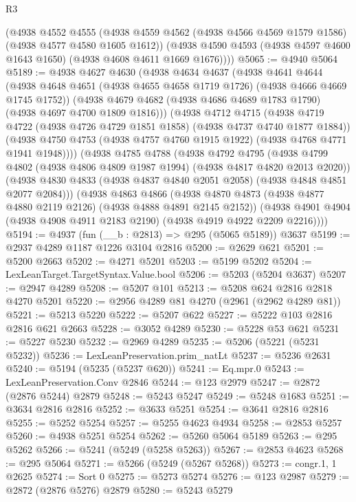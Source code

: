 \begin{lexlean}{R3}
\begin{coremodule}
      (@4938
        @4552
        @4555
        (@4938 @4559 @4562 (@4938 @4566 @4569 @1579 @1586) (@4938 @4577 @4580 @1605 @1612))
        (@4938 @4590 @4593 (@4938 @4597 @4600 @1643 @1650) (@4938 @4608 @4611 @1669 @1676))))
@5065 := @4940 @5064
@5189 := @4938
    @4627
    @4630
    (@4938
      @4634
      @4637
      (@4938
        @4641
        @4644
        (@4938 @4648 @4651 (@4938 @4655 @4658 @1719 @1726) (@4938 @4666 @4669 @1745 @1752))
        (@4938 @4679 @4682 (@4938 @4686 @4689 @1783 @1790) (@4938 @4697 @4700 @1809 @1816)))
      (@4938
        @4712
        @4715
        (@4938 @4719 @4722 (@4938 @4726 @4729 @1851 @1858) (@4938 @4737 @4740 @1877 @1884))
        (@4938 @4750 @4753 (@4938 @4757 @4760 @1915 @1922) (@4938 @4768 @4771 @1941 @1948))))
    (@4938
      @4785
      @4788
      (@4938
        @4792
        @4795
        (@4938 @4799 @4802 (@4938 @4806 @4809 @1987 @1994) (@4938 @4817 @4820 @2013 @2020))
        (@4938 @4830 @4833 (@4938 @4837 @4840 @2051 @2058) (@4938 @4848 @4851 @2077 @2084)))
      (@4938
        @4863
        @4866
        (@4938 @4870 @4873 (@4938 @4877 @4880 @2119 @2126) (@4938 @4888 @4891 @2145 @2152))
        (@4938 @4901 @4904 (@4938 @4908 @4911 @2183 @2190) (@4938 @4919 @4922 @2209 @2216))))
@5194 := @4937 (fun (__b : @2813) => @295 (@5065 @5189)) @3637
@5199 := @2937 @4289 @1187 @1226 @3104 @2816
@5200 := @2629 @621
@5201 := @5200 @2663
@5202 := @4271 @5201
@5203 := @5199 @5202
@5204 := LexLeanTarget.TargetSyntax.Value.bool
@5206 := @5203 (@5204 @3637)
@5207 := @2947 @4289
@5208 := @5207 @101
@5213 := @5208 @624 @2816 @2818 @4270 @5201
@5220 := @2956 @4289 @81 @4270 (@2961 (@2962 @4289 @81))
@5221 := @5213 @5220
@5222 := @5207 @622
@5227 := @5222 @103 @2816 @2816 @621 @2663
@5228 := @3052 @4289
@5230 := @5228 @53 @621
@5231 := @5227 @5230
@5232 := @2969 @4289
@5235 := @5206 (@5221 (@5231 @5232))
@5236 := LexLeanPreservation.prim_natLt
@5237 := @5236 @2631
@5240 := @5194 (@5235 (@5237 @620))
@5241 := Eq.mpr.{0}
@5243 := LexLeanPreservation.Conv @2846
@5244 := @123 @2979
@5247 := @2872 (@2876 @5244) @2879
@5248 := @5243 @5247
@5249 := @5248 @1683
@5251 := @3634 @2816 @2816
@5252 := @3633 @5251
@5254 := @3641 @2816 @2816
@5255 := @5252 @5254
@5257 := @5255 @4623 @4934
@5258 := @2853 @5257
@5260 := @4938 @5251 @5254
@5262 := @5260 @5064 @5189
@5263 := @295 @5262
@5266 := @5241 (@5249 (@5258 @5263))
@5267 := @2853 @4623
@5268 := @295 @5064
@5271 := @5266 (@5249 (@5267 @5268))
@5273 := congr.{1, 1} @2625
@5274 := Sort 0
@5275 := @5273 @5274
@5276 := @123 @2987
@5279 := @2872 (@2876 @5276) @2879
@5280 := @5243 @5279

\end{coremodule}
\end{lexlean}
